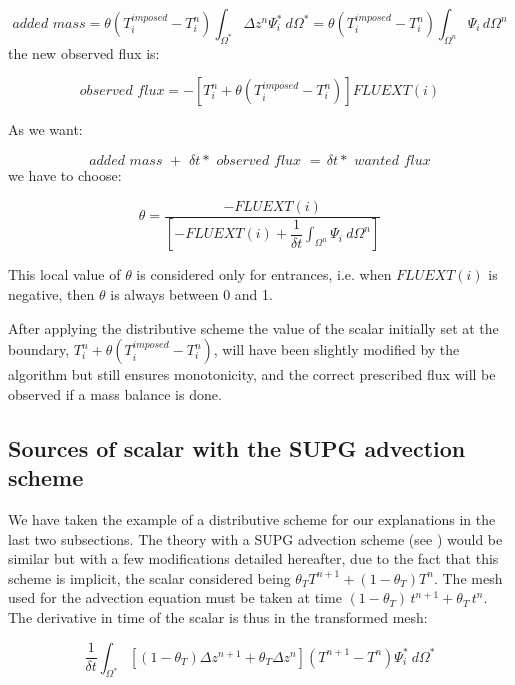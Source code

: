 \begin{equation}
added\,\,mass=\theta(T_{i}^{imposed}-T_{i}^{n})\int_{\Omega^{\ast}}\Delta
z^{n}\Psi_{i}^{\ast}~d\Omega^{\ast}=\theta(T_{i}^{imposed}-T_{i}^{n}%
)\int_{\Omega^{n}}\Psi_{i}\,d\Omega^{n}%
\end{equation}
the new observed flux is:%

\begin{equation}
observed\,\,flux=-\left[  T_{i}^{n}+\theta(T_{i}^{imposed}-T_{i}^{n})\right]
FLUEXT(i)
\end{equation}


As we want:%

\begin{equation}
added\,\,mass\,\,+\,\,\delta t\ast\,\,observed\,\,flux\,\,=\,\delta
t\ast\,\,wanted\,\,flux
\end{equation}
we have to choose:%

\begin{equation}
\theta=\dfrac{-FLUEXT(i)}{\left[  -FLUEXT(i)+\dfrac{1}{\delta t}\int_{\Omega
^{n}}\Psi_{i}~d\Omega^{n}\right]  }%
\end{equation}


This local value of $\theta$ is considered only for entrances, i.e. when
$FLUEXT(i)$ is negative, then $\theta$ is always between 0 and 1.

After applying the distributive scheme the value of the scalar initially set
at the boundary, $T_{i}^{n}+\theta(T_{i}^{imposed}-T_{i}^{n})$, will have been
slightly modified by the algorithm but still ensures monotonicity, and the
correct prescribed flux will be observed if a mass balance is done.

\subsection{Sources of scalar with the SUPG advection scheme%
%
}

We have taken the example of a distributive scheme for our explanations in the
last two subsections. The theory with a SUPG advection scheme (see
\cite{hervouet007}) would be similar but with a few modifications detailed
hereafter, due to the fact that this scheme is implicit, the scalar considered
being $\theta_{T}T^{n+1}+(1-\theta_{T})T^{n}$. The mesh used for the advection
equation must be taken at time $(1-\theta_{T})\,t^{n+1}+\theta_{T}\,t^{n}$.
The derivative in time of the scalar is thus in the transformed mesh:%

\begin{equation}
\dfrac{1}{\delta t}\int_{\Omega^{\ast}}\left[  (1-\theta_{T})\Delta
z^{n+1}+\theta_{T}\Delta z^{n}\right]  \left(  T^{n+1}-T^{n}\right)  \Psi
_{i}^{\ast}~d\Omega^{\ast}%
\end{equation}


